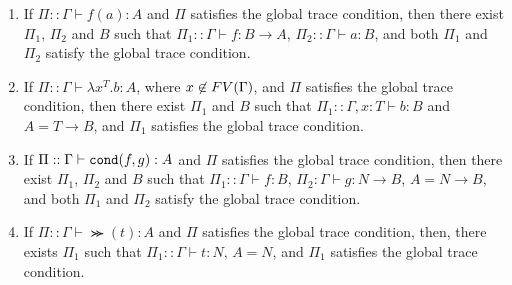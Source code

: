 \begin{lemma}\label{lem:inversion}
  \begin{enumerate}
  \item\label{lem:inversion1}
    If $\Pi::\Gamma\vdash f(a):A$ and $\Pi$ satisfies the global trace condition, then
    there exist $\Pi_1$, $\Pi_2$ and $B$ such that
    $\Pi_1::\Gamma\vdash f:B\to A$, $\Pi_2::\Gamma\vdash a:B$,
    and both $\Pi_1$ and $\Pi_2$ satisfy the global trace condition. 
  \item\label{lem:inversion2}
    If $\Pi::\Gamma\vdash \lambda x^T.b:A$, where $x\not\in{{\relax FV}}(\Gamma)$,
    and $\Pi$ satisfies the global trace condition, then
    there exist $\Pi_1$ and $B$ such that
    $\Pi_1::\Gamma,x:T\vdash b:B$ and $A = T\to B$,
    and $\Pi_1$ satisfies the global trace condition. 
  \item\label{lem:inversion3}
    If $\Pi::\Gamma\vdash {\tt cond}(f,g):A$ and $\Pi$ satisfies the global trace condition, then
    there exist $\Pi_1$, $\Pi_2$ and $B$ such that
    $\Pi_1::\Gamma \vdash f:B$, $\Pi_2:\Gamma \vdash g:N\to B$, $A = N\to B$,
    and both $\Pi_1$ and $\Pi_2$ satisfy the global trace condition. 
  \item\label{lem:inversion4}
    If $\Pi::\Gamma\vdash \Succ(t):A$ and $\Pi$ satisfies the global trace condition, 
    then, there exists $\Pi_1$ such that $\Pi_1::\Gamma \vdash t:N$, $A=N$, 
 and $\Pi_1$ satisfies the global trace condition. 
  \end{enumerate}
\end{lemma}

%
%
%  
%

